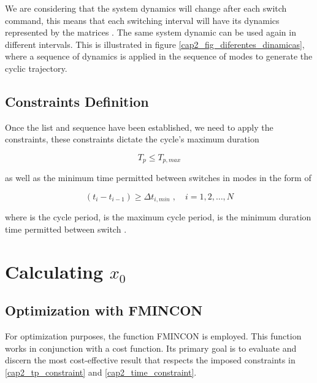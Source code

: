     We are considering that the system dynamics will change after each switch command, this means that each 
    switching interval will have its dynamics represented by the matrices . The same system 
    dynamic can be used again in different intervals. This is illustrated in figure \ref{cap2_fig_diferentes_dinamicas},
    where a sequence of dynamics is applied in the sequence of modes \highlight{$\big[4,2,1,2,3\big]$} to generate the cyclic trajectory.

\subsection{Constraints Definition}

    Once the list and sequence have been established, we need to apply the constraints,
    these constraints dictate the cycle's maximum duration
    
    \noindent
    \begin{equation}
        \label{cap2_tp_constraint}
        T_p \le T_{p,max}
    \end{equation}
    
    \noindent
    as well as the minimum time permitted between switches in modes in the form of

    \noindent
    \begin{equation}
        \label{cap2_time_constraint}
        (t_i - t_{i - 1}) \ge \Delta t_{i,min}\;, \quad i = 1,2,\dotso,N
    \end{equation}

    \noindent
    where  is the cycle period,  is the maximum cycle period,
     is the minimum duration time permitted between switch .

\section{Calculating \texorpdfstring{$x_0$}{x\_0}}

    

\subsection{Optimization with FMINCON}

    For optimization purposes, the function FMINCON is employed. This function works 
    in conjunction with a cost function. Its primary goal is to evaluate and 
    discern the most cost-effective result that respects the imposed constraints in \eqref{cap2_tp_constraint} and 
    \eqref{cap2_time_constraint}.
    
